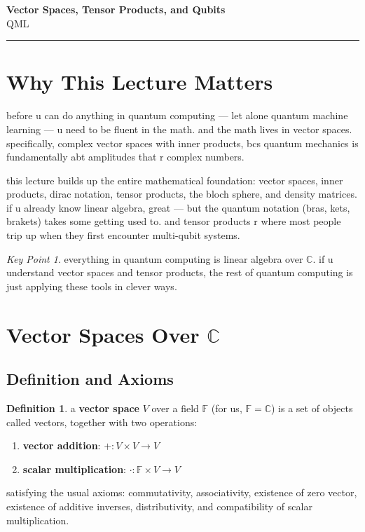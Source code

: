 \documentclass[11pt,a4paper]{article}
\theoremstyle{definition}
\newtheorem{definition}{Definition}[section]
\theoremstyle{remark}
\newtheorem*{keypoint}{Key Point}
\begin{document}
\begin{center}
    {\LARGE \textbf{Vector Spaces, Tensor Products, and Qubits}}\\[8pt]
    {\large QML}\\[12pt]
    \hrule
\end{center}

\vspace{12pt}
\tableofcontents
\newpage

\section{Why This Lecture Matters}

before u can do anything in quantum computing --- let alone quantum machine learning --- u need to be fluent in the math. and the math lives in vector spaces. specifically, complex vector spaces with inner products, bcs quantum mechanics is fundamentally abt amplitudes that r complex numbers.

this lecture builds up the entire mathematical foundation: vector spaces, inner products, dirac notation, tensor products, the bloch sphere, and density matrices. if u already know linear algebra, great --- but the quantum notation (bras, kets, brakets) takes some getting used to. and tensor products r where most people trip up when they first encounter multi-qubit systems.

\begin{keypoint}
everything in quantum computing is linear algebra over $\mathbb{C}$. if u understand vector spaces and tensor products, the rest of quantum computing is just applying these tools in clever ways.
\end{keypoint}

\section{Vector Spaces Over $\mathbb{C}$}

\subsection{Definition and Axioms}

\begin{definition}
a \textbf{vector space} $V$ over a field $\mathbb{F}$ (for us, $\mathbb{F} = \mathbb{C}$) is a set of objects called vectors, together with two operations:
\begin{enumerate}[label=(\roman*)]
    \item \textbf{vector addition}: $+: V \times V \to V$
    \item \textbf{scalar multiplication}: $\cdot: \mathbb{F} \times V \to V$
\end{enumerate}
satisfying the usual axioms: commutativity, associativity, existence of zero vector, existence of additive inverses, distributivity, and compatibility of scalar multiplication.
\end{definition}
\end{document}
